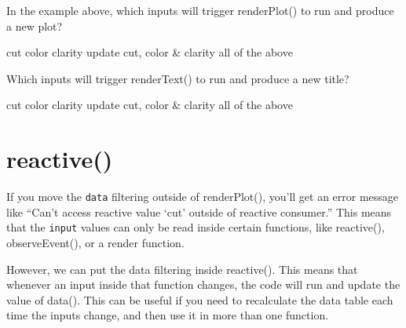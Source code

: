 \documentclass[
]{book}
\begin{document}
In the example above, which inputs will trigger renderPlot() to run and produce a new plot?

cut color clarity update cut, color \& clarity all of the above

Which inputs will trigger renderText() to run and produce a new title?

cut color clarity update cut, color \& clarity all of the above

\hypertarget{reactive-1}{%
\section{reactive()}\label{reactive-1}}

If you move the \texttt{data} filtering outside of renderPlot(), you'll get an error message like ``Can't access reactive value `cut' outside of reactive consumer.'' This means that the \texttt{input} values can only be read inside certain functions, like reactive(), observeEvent(), or a render function.

However, we can put the data filtering inside reactive(). This means that whenever an input inside that function changes, the code will run and update the value of data(). This can be useful if you need to recalculate the data table each time the inputs change, and then use it in more than one function.
\end{document}
